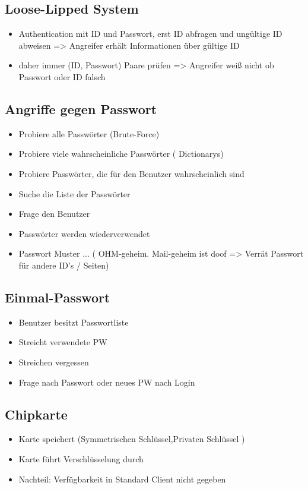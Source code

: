 \subsection*{Loose-Lipped System}
\begin{itemize}
	\item  Authentication mit ID und Passwort, erst ID abfragen und ungültige ID abweisen => Angreifer erhält Informationen über gültige ID
	\item daher immer (ID, Passwort) Paare prüfen => Angreifer weiß nicht ob Passwort oder ID falsch
\end{itemize}

\subsection*{ Angriffe gegen Passwort}
\begin{itemize}
	\item Probiere alle Passwörter (Brute-Force)
	\item Probiere viele wahrscheinliche Passwörter ( Dictionarys)
	\item Probiere Passwörter, die für den Benutzer wahrscheinlich sind
	\item Suche die Liste der Passwörter
	\item Frage den Benutzer
	\item Passwörter werden wiederverwendet
	\item Passwort Muster ... ( OHM-geheim. Mail-geheim ist doof => Verrät Passwort für andere ID's / Seiten)
	\end{itemize}

\subsection*{ Einmal-Passwort}
\begin{itemize}
	\item Benutzer besitzt Passwortliste
	\item Streicht verwendete PW
	\item Streichen vergessen
	\item  Frage nach Passwort oder neues PW nach Login
\end{itemize}

\subsection*{ Chipkarte}
\begin{itemize}
	\item Karte speichert (Symmetrischen Schlüssel,Privaten Schlüssel )
	\item Karte führt Verschlüsselung durch
	\item Nachteil: Verfügbarkeit in Standard Client nicht gegeben
\end{itemize}

